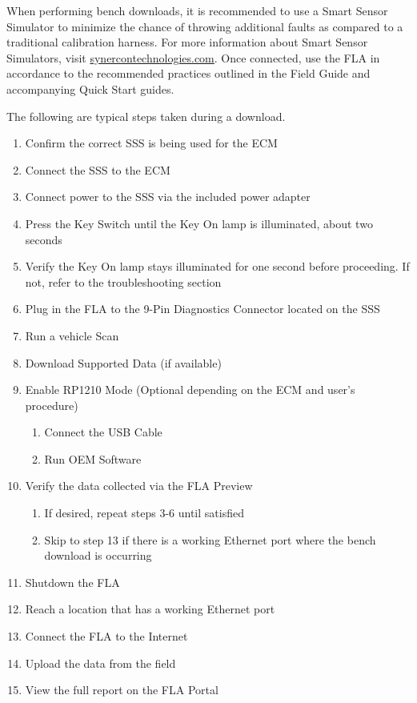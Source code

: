 \documentclass[11pt, oneside]{book}
\begin{document}
When performing bench downloads, it is recommended to use a Smart
Sensor Simulator to minimize the chance of throwing additional faults
as compared to a traditional calibration harness. For more information
about Smart Sensor Simulators, visit \url{synercontechnologies.com}.
Once connected, use the FLA in accordance to the recommended practices
outlined in the Field Guide and accompanying Quick Start guides.

The following are typical steps taken during a download.
\begin{enumerate}
\item Confirm the correct SSS is being used for the ECM
\item Connect the SSS to the ECM
\item Connect power to the SSS via the included power adapter
\item Press the Key Switch until the Key On lamp is illuminated, about two
seconds
\item Verify the Key On lamp stays illuminated for one second before proceeding.
If not, refer to the troubleshooting section
\item Plug in the FLA to the 9-Pin Diagnostics Connector located on the
SSS
\item Run a vehicle Scan
\item Download Supported Data (if available)
\item Enable RP1210 Mode (Optional depending on the ECM and user's procedure)

\begin{enumerate}
\item Connect the USB Cable
\item Run OEM Software
\end{enumerate}
\item Verify the data collected via the FLA Preview

\begin{enumerate}
\item If desired, repeat steps 3-6 until satisfied
\item Skip to step 13 if there is a working Ethernet port where the bench
download is occurring
\end{enumerate}
\item Shutdown the FLA
\item Reach a location that has a working Ethernet port
\item Connect the FLA to the Internet
\item Upload the data from the field
\item View the full report on the FLA Portal
\end{enumerate}
\end{document}
